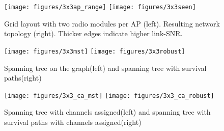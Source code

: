     \begin{figure}[h!]
      \centering
      \texttt{[image: figures/3x3ap\_range]}
      \texttt{[image: figures/3x3seen]}
      \caption{Grid layout with two radio modules per \ac{AP} (left). Resulting network topology (right). Thicker edges indicate higher link-SNR.}
      \label{fig:3x3initial}
    \end{figure}
    
    \begin{figure}[h!]
      \centering
      \texttt{[image: figures/3x3mst]}
      \texttt{[image: figures/3x3robust]}
      \caption{Spanning tree on the graph(left) and spanning tree with survival paths(right)}
      \label{fig:3x3second}
    \end{figure}
    
    \begin{figure}[h!]
      \centering
      \texttt{[image: figures/3x3\_ca\_mst]}
      \texttt{[image: figures/3x3\_ca\_robust]}
      \caption{Spanning tree with channels assigned(left) and spanning tree with survival paths with channels assigned(right)}
      \label{fig:3x3third}
    \end{figure}
    
    \newpage
  
